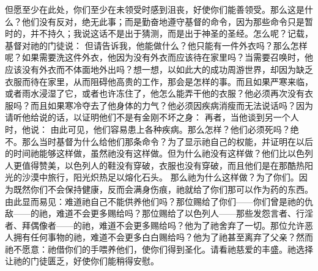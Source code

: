 但愿至少在此处，你们至少在未领受时感到沮丧，好使你们能善领受。那么这是什么？他们没有反对，绝无此事；而是勤奋地遵守基督的命令，因为那些命令只是暂时的，并不持久；我说这话不是出于猜测，而是出于神圣的圣经。怎么呢？记载，基督对祂的门徒说：  但请告诉我，他能做什么？他只能有一件外衣吗？那么怎样呢？如果需要洗这件外衣，他因为没有外衣而应该待在家里吗？当需要召唤时，他应该没有外衣而不体面地外出吗？想一想，以如此大的成功周游世界，却因为缺乏衣服而待在家里，从而阻碍他高贵的工作，那会是怎样的事。而且如果严寒来临，或者雨水浸湿了它，或者也许冻住了，他怎么能弄干他的衣服？他必须再次没有衣服吗？而且如果寒冷夺去了他身体的力气？他必须因疾病消瘦而无法说话吗？因为请听他给说的话，以证明他们不是有金刚不坏之身：  再者，当他谈到另一个人时，他说：    由此可见，他们容易患上各种疾病。那么怎样？他们必须死吗？绝不。那么当时基督为什么给他们那条命令？为了显示祂自己的权能，并证明在以后的时间祂能够这样做，虽然祂没有这样做。但为什么祂没有这样做？他们比以色列人更值得赞美，以色列人的鞋没有穿破，衣服也没有穿破，而且他们是在那酷热阳光的沙漠中旅行，阳光炽热足以熔化石头。 那么祂为什么这样做？为了你们。因为既然你们不会保持健康，反而会满身伤痕，祂就给了你们那可以作为药的东西。由此显而易见：难道祂自己不能供养他们吗？那位赐给了你们——你们曾是祂的仇敌——的祂，难道不会更多赐给吗？那位赐给了以色列人——那些发怨言者、行淫者、拜偶像者——的祂，难道不会更多赐给吗？他为了祂舍弃了一切。那位允许恶人拥有任何事物的祂，难道不会更多白白赐给吗？他为了祂甚至离弃了父亲？然而祂不愿意：祂借你们的手喂养他们，使你们得到圣化。请看祂慈爱的丰盛。祂选择让祂的门徒匮乏，好使你们能稍得安慰。\par

